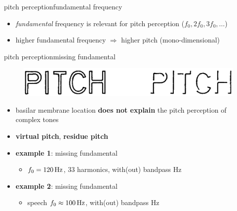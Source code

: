         \begin{frame}{pitch perception}{fundamental frequency}
            \vspace{-2mm}
            \begin{itemize}
                \item	\textit{fundamental} frequency is relevant for pitch perception ($f_0,2f_0,3f_0,\ldots$)

                
                \item	higher fundamental frequency $\Rightarrow$ higher pitch (mono-dimensional)
            \end{itemize}
        \end{frame}
        \begin{frame}{pitch perception}{missing fundamental }
            \vspace{-5mm}
                \begin{figure}
                    \includegraphics[scale=.3]{graph/virtualpitchillustration}
                \end{figure}
            \begin{itemize}
                \item   basilar membrane location \textbf{does not explain} the pitch perception of complex tones

                \bigskip
                \item<2->[$\Rightarrow$] \textbf{virtual pitch}, \textbf{residue pitch}

                \bigskip
                \item<3->   \textbf{example 1}: missing fundamental 
                    \begin{itemize}
                        \item   $f_0 = \unit[120]{Hz}$, 33 harmonics, with(out) bandpass \unit[300-2400]{Hz}
                    \end{itemize}
                \item<3->   \textbf{example 2}: missing fundamental 
                    \begin{itemize}
                        \item   speech $f_0 \approx \unit[100]{Hz}$, with(out) bandpass \unit[300-4000]{Hz}
                    \end{itemize}
            \end{itemize}
        \end{frame}
        
